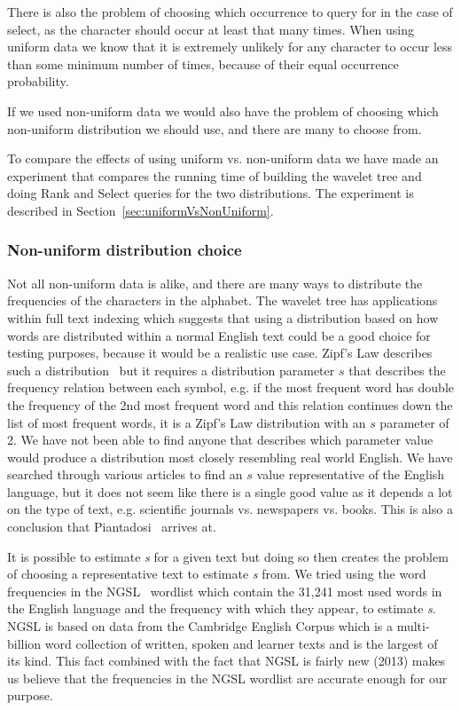 There is also the problem of choosing which occurrence to query for in the case of select, as the character should occur at least that many times.
When using uniform data we know that it is extremely unlikely for any character to occur less than some minimum number of times, because of their equal occurrence probability.

If we used non-uniform data we would also have the problem of choosing which non-uniform distribution we should use, and there are many to choose from.

To compare the effects of using uniform vs. non-uniform data we have made an experiment that compares the running time of building the wavelet tree and doing Rank and Select queries for the two distributions. 
The experiment is described in Section~\ref{sec:uniformVsNonUniform}.

\subsubsection{Non-uniform distribution choice}
Not all non-uniform data is alike, and there are many ways to distribute the frequencies of the characters in the alphabet.
The wavelet tree has applications within full text indexing which suggests that using a distribution based on how words are distributed within a normal English text could be a good choice for testing purposes, because it would be a realistic use case. 
Zipf's Law describes such a distribution~ but it requires a distribution parameter $s$ that describes the frequency relation between each symbol, e.g. if the most frequent word has double the frequency of the 2nd most frequent word and this relation continues down the list of most frequent words, it is a Zipf's Law distribution with an $s$ parameter of 2.
We have not been able to find anyone that describes which parameter value would produce a distribution most closely resembling real world English. 
We have searched through various articles to find an $s$ value representative of the English language, but it does not seem like there is a single good value as it depends a lot on the type of text, e.g. scientific journals vs. newspapers vs. books.
This is also a conclusion that Piantadosi~ arrives at.

It is possible to estimate \textit{s} for a given text but doing so then creates the problem of choosing a representative text to estimate \textit{s} from.
We tried using the word frequencies in the NGSL~ wordlist which contain the 31,241 most used words in the English language and the frequency with which they appear, to estimate \textit{s}.
NGSL is based on data from the Cambridge English Corpus which is a multi-billion word collection of written, spoken and learner texts and is the largest of its kind.
This fact combined with the fact that NGSL is fairly new (2013) makes us believe that the frequencies in the NGSL wordlist are accurate enough for our purpose.

